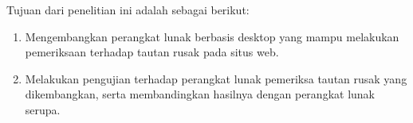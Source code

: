 Tujuan dari penelitian ini adalah sebagai berikut:

\begin{enumerate}

    \item Mengembangkan perangkat lunak berbasis desktop yang mampu melakukan pemeriksaan terhadap tautan rusak pada situs web.
    
    \item Melakukan pengujian terhadap perangkat lunak pemeriksa tautan rusak yang dikembangkan, serta membandingkan hasilnya dengan perangkat lunak serupa.
    
\end{enumerate}